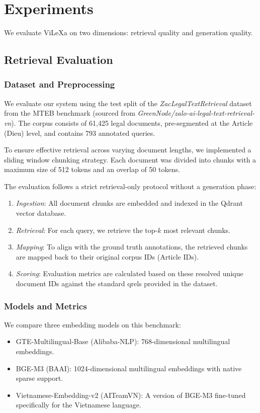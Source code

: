 \documentclass[letterpaper]{article} %
\begin{document}
\section{Experiments} \label{sec:experiments}

We evaluate ViLeXa on two dimensions: retrieval quality and generation quality.

\subsection{Retrieval Evaluation}

\subsubsection{Dataset and Preprocessing}

We evaluate our system using the test split of the \textit{ZacLegalTextRetrieval} dataset from the MTEB benchmark (sourced from \textit{GreenNode/zalo-ai-legal-text-retrieval-vn}). The corpus consists of 61,425 legal documents, pre-segmented at the Article (Dieu) level, and contains 793 annotated queries.

To ensure effective retrieval across varying document lengths, we implemented a sliding window chunking strategy. Each document was divided into chunks with a maximum size of 512 tokens and an overlap of 50 tokens.

The evaluation follows a strict retrieval-only protocol without a generation phase:
\begin{enumerate}
    \item \textit{Ingestion}: All document chunks are embedded and indexed in the Qdrant vector database.
    \item \textit{Retrieval}: For each query, we retrieve the top-$k$ most relevant chunks.
    \item \textit{Mapping}: To align with the ground truth annotations, the retrieved chunks are mapped back to their original corpus IDs (Article IDs).
    \item \textit{Scoring}: Evaluation metrics are calculated based on these resolved unique document IDs against the standard qrels provided in the dataset.
\end{enumerate}

\subsubsection{Models and Metrics}

We compare three embedding models on this benchmark:
\begin{itemize}
    \item GTE-Multilingual-Base (Alibaba-NLP): 768-dimensional multilingual embeddings.
    \item BGE-M3 (BAAI): 1024-dimensional multilingual embeddings with native sparse support.
    \item Vietnamese-Embedding-v2 (AITeamVN): A version of BGE-M3 fine-tuned specifically for the Vietnamese language.
\end{itemize}
\end{document}
